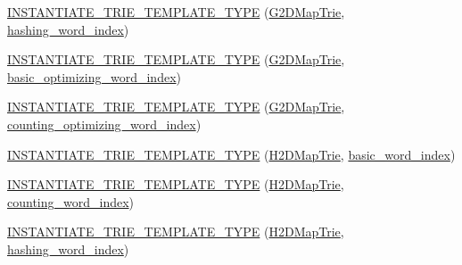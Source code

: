 \begin{DoxyCompactItemize}
\item 
\hyperlink{namespaceuva_1_1smt_1_1bpbd_1_1server_1_1lm_a308b699ffa8d6435445669ac29d15dff}{I\+N\+S\+T\+A\+N\+T\+I\+A\+T\+E\+\_\+\+T\+R\+I\+E\+\_\+\+T\+E\+M\+P\+L\+A\+T\+E\+\_\+\+T\+Y\+P\+E} (\hyperlink{classuva_1_1smt_1_1bpbd_1_1server_1_1lm_1_1_g2_d_map_trie}{G2\+D\+Map\+Trie}, \hyperlink{classuva_1_1smt_1_1bpbd_1_1server_1_1lm_1_1dictionary_1_1hashing__word__index}{hashing\+\_\+word\+\_\+index})
\item 
\hyperlink{namespaceuva_1_1smt_1_1bpbd_1_1server_1_1lm_a9893bef363eec46536e62ea7ceea01d3}{I\+N\+S\+T\+A\+N\+T\+I\+A\+T\+E\+\_\+\+T\+R\+I\+E\+\_\+\+T\+E\+M\+P\+L\+A\+T\+E\+\_\+\+T\+Y\+P\+E} (\hyperlink{classuva_1_1smt_1_1bpbd_1_1server_1_1lm_1_1_g2_d_map_trie}{G2\+D\+Map\+Trie}, \hyperlink{namespaceuva_1_1smt_1_1bpbd_1_1server_1_1lm_1_1dictionary_a3001583c904eec702b4a4125082a7ecd}{basic\+\_\+optimizing\+\_\+word\+\_\+index})
\item 
\hyperlink{namespaceuva_1_1smt_1_1bpbd_1_1server_1_1lm_a77720915e3ec3c481e4b7f3b365a4199}{I\+N\+S\+T\+A\+N\+T\+I\+A\+T\+E\+\_\+\+T\+R\+I\+E\+\_\+\+T\+E\+M\+P\+L\+A\+T\+E\+\_\+\+T\+Y\+P\+E} (\hyperlink{classuva_1_1smt_1_1bpbd_1_1server_1_1lm_1_1_g2_d_map_trie}{G2\+D\+Map\+Trie}, \hyperlink{namespaceuva_1_1smt_1_1bpbd_1_1server_1_1lm_1_1dictionary_a61cbd647b15de785ccf4cdd26661c366}{counting\+\_\+optimizing\+\_\+word\+\_\+index})
\item 
\hyperlink{namespaceuva_1_1smt_1_1bpbd_1_1server_1_1lm_a1660db0237ec2c65c548a1281894470e}{I\+N\+S\+T\+A\+N\+T\+I\+A\+T\+E\+\_\+\+T\+R\+I\+E\+\_\+\+T\+E\+M\+P\+L\+A\+T\+E\+\_\+\+T\+Y\+P\+E} (\hyperlink{classuva_1_1smt_1_1bpbd_1_1server_1_1lm_1_1_h2_d_map_trie}{H2\+D\+Map\+Trie}, \hyperlink{classuva_1_1smt_1_1bpbd_1_1server_1_1lm_1_1dictionary_1_1basic__word__index}{basic\+\_\+word\+\_\+index})
\item 
\hyperlink{namespaceuva_1_1smt_1_1bpbd_1_1server_1_1lm_aabcf800ebcfa9f9c158ab34f747629f0}{I\+N\+S\+T\+A\+N\+T\+I\+A\+T\+E\+\_\+\+T\+R\+I\+E\+\_\+\+T\+E\+M\+P\+L\+A\+T\+E\+\_\+\+T\+Y\+P\+E} (\hyperlink{classuva_1_1smt_1_1bpbd_1_1server_1_1lm_1_1_h2_d_map_trie}{H2\+D\+Map\+Trie}, \hyperlink{classuva_1_1smt_1_1bpbd_1_1server_1_1lm_1_1dictionary_1_1counting__word__index}{counting\+\_\+word\+\_\+index})
\item 
\hyperlink{namespaceuva_1_1smt_1_1bpbd_1_1server_1_1lm_af1c9b75363629a30248f5e1da9fb699f}{I\+N\+S\+T\+A\+N\+T\+I\+A\+T\+E\+\_\+\+T\+R\+I\+E\+\_\+\+T\+E\+M\+P\+L\+A\+T\+E\+\_\+\+T\+Y\+P\+E} (\hyperlink{classuva_1_1smt_1_1bpbd_1_1server_1_1lm_1_1_h2_d_map_trie}{H2\+D\+Map\+Trie}, \hyperlink{classuva_1_1smt_1_1bpbd_1_1server_1_1lm_1_1dictionary_1_1hashing__word__index}{hashing\+\_\+word\+\_\+index})

\end{DoxyCompactItemize}
